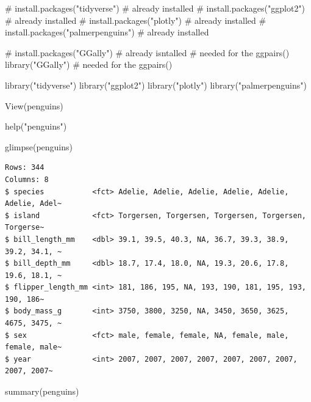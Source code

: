 \documentclass[
  letterpaper,
  DIV=11,
  numbers=noendperiod]{scrartcl}
\newenvironment{Shaded}{\begin{snugshade}}{\end{snugshade}}
\newcommand{\CommentTok}[1]{\textcolor[rgb]{0.37,0.37,0.37}{#1}}
\newcommand{\FunctionTok}[1]{\textcolor[rgb]{0.28,0.35,0.67}{#1}}
\newcommand{\NormalTok}[1]{\textcolor[rgb]{0.00,0.23,0.31}{#1}}
\newcommand{\StringTok}[1]{\textcolor[rgb]{0.13,0.47,0.30}{#1}}
\begin{document}
\begin{Shaded}
\begin{Highlighting}[]
\CommentTok{\# install.packages("tidyverse") \# already installed}
\CommentTok{\# install.packages("ggplot2") \# already installed}
\CommentTok{\# install.packages("plotly") \# already installed}
\CommentTok{\# install.packages("palmerpenguins") \# already installed}

\CommentTok{\# install.packages("GGally") \# already isntalled \# needed for the ggpairs()}
\FunctionTok{library}\NormalTok{(}\StringTok{"GGally"}\NormalTok{) }\CommentTok{\# needed for the ggpairs()}

\FunctionTok{library}\NormalTok{(}\StringTok{"tidyverse"}\NormalTok{)}
\FunctionTok{library}\NormalTok{(}\StringTok{"ggplot2"}\NormalTok{)}
\FunctionTok{library}\NormalTok{(}\StringTok{"plotly"}\NormalTok{)}
\FunctionTok{library}\NormalTok{(}\StringTok{"palmerpenguins"}\NormalTok{)}

\FunctionTok{View}\NormalTok{(penguins)}

\FunctionTok{help}\NormalTok{(}\StringTok{"penguins"}\NormalTok{)}

\FunctionTok{glimpse}\NormalTok{(penguins)}
\end{Highlighting}
\end{Shaded}

\begin{verbatim}
Rows: 344
Columns: 8
$ species           <fct> Adelie, Adelie, Adelie, Adelie, Adelie, Adelie, Adel~
$ island            <fct> Torgersen, Torgersen, Torgersen, Torgersen, Torgerse~
$ bill_length_mm    <dbl> 39.1, 39.5, 40.3, NA, 36.7, 39.3, 38.9, 39.2, 34.1, ~
$ bill_depth_mm     <dbl> 18.7, 17.4, 18.0, NA, 19.3, 20.6, 17.8, 19.6, 18.1, ~
$ flipper_length_mm <int> 181, 186, 195, NA, 193, 190, 181, 195, 193, 190, 186~
$ body_mass_g       <int> 3750, 3800, 3250, NA, 3450, 3650, 3625, 4675, 3475, ~
$ sex               <fct> male, female, female, NA, female, male, female, male~
$ year              <int> 2007, 2007, 2007, 2007, 2007, 2007, 2007, 2007, 2007~
\end{verbatim}

\begin{Shaded}
\begin{Highlighting}[]
\FunctionTok{summary}\NormalTok{(penguins)}
\end{Highlighting}
\end{Shaded}
\end{document}
